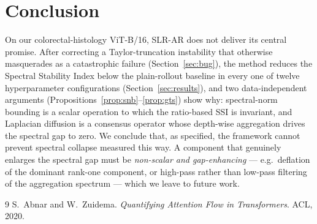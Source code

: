 \documentclass[11pt]{article}
\begin{document}
\section{Conclusion}

On our colorectal-histology ViT-B/16, SLR-AR does not deliver its central
promise. After correcting a Taylor-truncation instability that otherwise
masquerades as a catastrophic failure (Section~\ref{sec:bug}), the method
reduces the Spectral Stability Index below the plain-rollout baseline in every
one of twelve hyperparameter configurations (Section~\ref{sec:results}), and two
data-independent arguments (Propositions~\ref{prop:snb}--\ref{prop:gts}) show
why: spectral-norm bounding is a scalar operation to which the ratio-based SSI is
invariant, and Laplacian diffusion is a consensus operator whose depth-wise
aggregation drives the spectral gap to zero. We conclude that, as specified, the
framework cannot prevent spectral collapse measured this way. A component that
genuinely enlarges the spectral gap must be \emph{non-scalar and gap-enhancing}
--- e.g.\ deflation of the dominant rank-one component, or high-pass rather than
low-pass filtering of the aggregation spectrum --- which we leave to future work.

\begin{thebibliography}{9}
 S.~Abnar and W.~Zuidema.
\textit{Quantifying Attention Flow in Transformers}. ACL, 2020.
\end{thebibliography}
\end{document}
